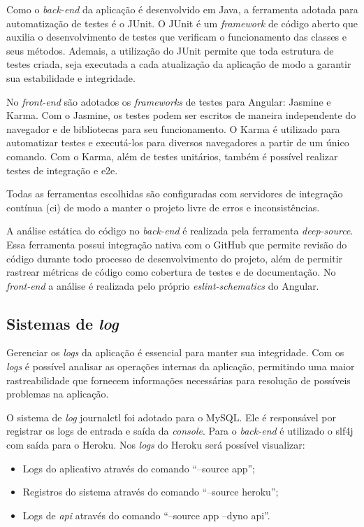 \documentclass[
    12pt,               %
    openright,          %
    oneside,
    a4paper,            %
    english,            %
    brazil              %
    ]{ifsp-spo-inf-ctds} %
\begin{document}
Como o \textit{\gls{back-end}} da aplicação é desenvolvido em Java, a ferramenta adotada para automatização de testes é o JUnit. O JUnit é um \textit{\gls{framework}} de código aberto que auxilia o desenvolvimento de testes que verificam o funcionamento das classes e seus métodos. Ademais, a utilização do JUnit permite que toda estrutura de testes criada, seja executada a cada atualização da aplicação  de modo a garantir sua estabilidade e integridade.


No \textit{\gls{front-end}} são adotados os \textit{\glspl{framework}} de testes para Angular: Jasmine e Karma. Com o Jasmine, os testes podem ser escritos de maneira independente do navegador e de bibliotecas para seu funcionamento. O Karma é utilizado para automatizar testes e executá-los para diversos navegadores a partir de um único comando. Com o Karma, além de testes unitários, também é possível realizar testes de integração e \ac{e2e}.


Todas as ferramentas escolhidas são configuradas com servidores de integração contínua (\ac{ci}) de modo a manter o projeto livre de erros e inconsistências.


A análise estática do código no \textit{\gls{back-end}} é realizada pela ferramenta \textit{\gls{deep-source}}. Essa ferramenta possui integração nativa com o GitHub que permite revisão do código durante todo processo de desenvolvimento do projeto, além de permitir rastrear métricas de código como cobertura de testes e de documentação. No \textit{\gls{front-end}} a análise é realizada pelo próprio \textit{\gls{eslint-schematics}} do Angular.


\subsection{Sistemas de \textit{log}}
Gerenciar os \textit{\glspl{log}} da aplicação é essencial para manter sua integridade. Com os \textit{\glspl{log}} é possível analisar as operações internas da aplicação, permitindo uma maior rastreabilidade que fornecem informações necessárias para resolução de possíveis problemas na aplicação.


O sistema de \textit{\gls{log}} \gls{journalctl} foi adotado para o MySQL. Ele é responsável por registrar os logs de entrada e saída da \textit{console}. 
Para o \textit{\gls{back-end}} é utilizado o \ac{slf4j} com saída para o Heroku.  Nos \textit{\glspl{log}}  do Heroku será possível visualizar: 
\begin{itemize}
\item Logs do aplicativo através do comando “--source app”;
\item Registros do sistema através do comando “--source heroku”;
\item Logs de \textit{\ac{api}} através do comando “--source app --dyno api”.
\end{itemize}
\end{document}
